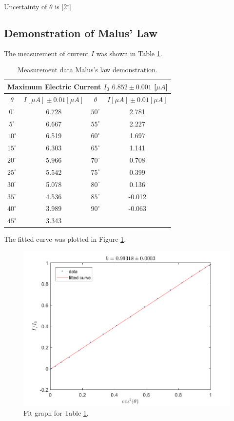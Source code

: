 \documentclass{article}
\begin{document}
Uncertainty of $\theta$ is [2$^\circ$]

\subsection{Demonstration of Malus' Law}

The measurement of current $I$ was shown in Table \ref{tab-1}.

\begin{table}[!h]
\begin{center}
\begin{tabular}{|c|c||c|c|}
\hline
\multicolumn{4}{|c|}{Maximum Electric Current $I_0$ $6.852\pm0.001$ [$\mu A$]}\\
\hline
$\theta$&$I[\mu A]\pm0.01[\mu A]$&$\theta$&$I[\mu A]\pm0.01[\mu A]$\\
\hline
$0^\circ$	&	6.728	&	$50^\circ$	&	2.781	\\
\hline
$5^\circ$	&	6.667	&	$55^\circ$	&	2.227	\\
\hline
$10^\circ$	&	6.519	&	$60^\circ$	&	1.697	\\
\hline
$15^\circ$	&	6.303	&	$65^\circ$	&	1.141	\\
\hline
$20^\circ$	&	5.966	&	$70^\circ$	&	0.708	\\
\hline
$25^\circ$	&	5.542	&	$75^\circ$	&	0.399	\\
\hline
$30^\circ$	&	5.078	&	$80^\circ$	&	0.136	\\
\hline
$35^\circ$	&	4.536	&	$85^\circ$	&	-0.012	\\
\hline
$40^\circ$	&	3.989	&	$90^\circ$	&	-0.063	\\
\hline
$45^\circ$	&	3.343	&				&			\\
\hline
\end{tabular}
\caption{Measurement data Malus's law demonstration.}
\label{tab-1}
\end{center}
\end{table}

The fitted curve was plotted in Figure \ref{fig-1}.\\

\begin{figure}[H]
\centering
\includegraphics[scale=0.5]{fig1.png}
\caption{Fit graph for Table \ref{tab-1}.}
\label{fig-1}
\end{figure}
\end{document}
